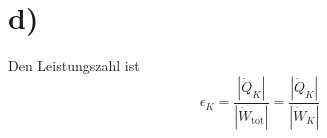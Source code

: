 

\section*{d)}
Den Leistungszahl ist
\[
\epsilon_K = \frac{\left| \dot{Q}_K \right|}{\left| \dot{W}_{\text{tot}} \right|} = \frac{\left| \dot{Q}_K \right|}{\left| \dot{W}_K \right|}
\]
